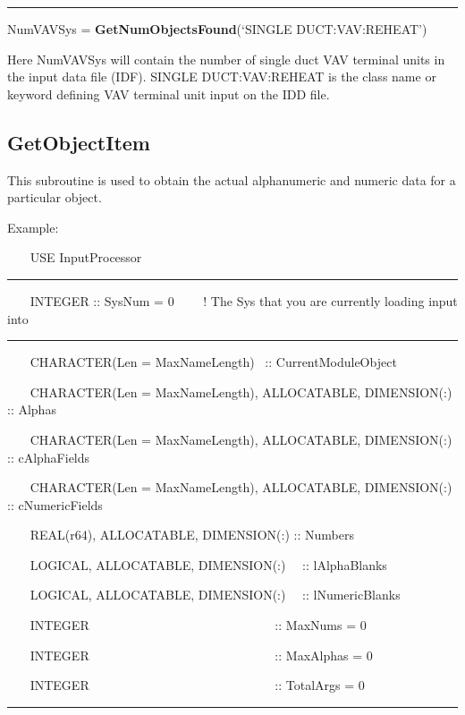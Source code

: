 \begin{center}\rule{0.5\linewidth}{\linethickness}\end{center}

NumVAVSys = \textbf{GetNumObjectsFound}(`SINGLE DUCT:VAV:REHEAT')

Here NumVAVSys will contain the number of single duct VAV terminal units in the input data file (IDF). SINGLE DUCT:VAV:REHEAT is the class name or keyword defining VAV terminal unit input on the IDD file.

\subsection{GetObjectItem}\label{getobjectitem}

This subroutine is used to obtain the actual alphanumeric and numeric data for a particular object.

Example:

~~~ USE InputProcessor

\begin{center}\rule{0.5\linewidth}{\linethickness}\end{center}

~~~ INTEGER :: SysNum = 0~~~~ ! The Sys that you are currently loading input into

\begin{center}\rule{0.5\linewidth}{\linethickness}\end{center}

~~~ CHARACTER(Len = MaxNameLength)~ :: CurrentModuleObject

~~~ CHARACTER(Len = MaxNameLength), ALLOCATABLE, DIMENSION(:) :: Alphas

~~~ CHARACTER(Len = MaxNameLength), ALLOCATABLE, DIMENSION(:) :: cAlphaFields

~~~ CHARACTER(Len = MaxNameLength), ALLOCATABLE, DIMENSION(:) :: cNumericFields

~~~ REAL(r64), ALLOCATABLE, DIMENSION(:) :: Numbers

~~~ LOGICAL, ALLOCATABLE, DIMENSION(:)~~ :: lAlphaBlanks

~~~ LOGICAL, ALLOCATABLE, DIMENSION(:)~~ :: lNumericBlanks

~~~ INTEGER~~~~~~~~~~~~~~~~~~~~~~~~~~~~~ :: MaxNums = 0

~~~ INTEGER~~~~~~~~~~~~~~~~~~~~~~~~~~~~~ :: MaxAlphas = 0

~~~ INTEGER~~~~~~~~~~~~~~~~~~~~~~~~~~~~~ :: TotalArgs = 0

\begin{center}\rule{0.5\linewidth}{\linethickness}\end{center}


